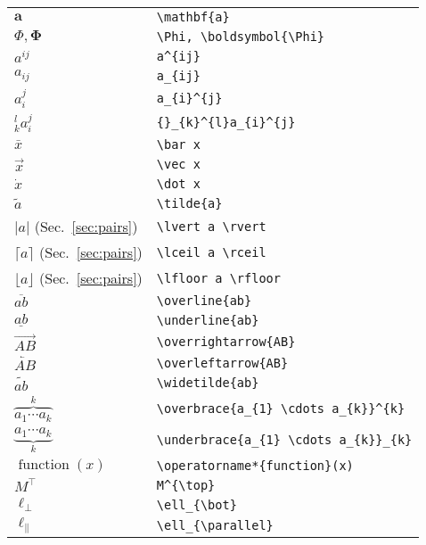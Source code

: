 \documentclass[a4paper,10pt,landscape]{article}
\theoremstyle{definition}
\theoremstyle{remark}
\newcommand{\refsec}[1]{Sec.~\ref{#1}}
\begin{document}
\begin{multicols}{3}
\begin{tabular}{@{}ll@{}}
	$\mathbf{a}$	&\verb!\mathbf{a}!\\
	$\Phi, \boldsymbol{\Phi}$	&\verb!\Phi, \boldsymbol{\Phi}!\\
	$a^{ij}$	&\verb!a^{ij}!\\
	$a_{ij}$	&\verb!a_{ij}!\\
	$a_{i}^{j}$	&\verb!a_{i}^{j}!\\
	${}_{k}^{l}a_{i}^{j}$	&\verb!{}_{k}^{l}a_{i}^{j}!\\
	$\bar x$	&\verb!\bar x!\\
	$\vec x$	&\verb!\vec x!\\
	$\dot x$	&\verb!\dot x!\\
	$\tilde{a}$	&\verb!\tilde{a}!\\
	$\lvert a \rvert$ (\refsec{sec:pairs})	&\verb!\lvert a \rvert!\\
	$\lceil a \rceil$ (\refsec{sec:pairs})	&\verb!\lceil a \rceil!\\
	$\lfloor a \rfloor$ (\refsec{sec:pairs})	&\verb!\lfloor a \rfloor!\\
	$\overline{ab}$	&\verb!\overline{ab}!\\
	$\underline{ab}$	&\verb!\underline{ab}!\\
	$\overrightarrow{AB}$	&\verb!\overrightarrow{AB}!\\
	$\overleftarrow{AB}$	&\verb!\overleftarrow{AB}!\\
	$\widetilde{ab}$	&\verb!\widetilde{ab}!\\
	$\overbrace{a_{1} \cdots a_{k}}^{k}$	&\verb!\overbrace{a_{1} \cdots a_{k}}^{k}!\\
	$\underbrace{a_{1} \cdots a_{k}}_{k}$	&\verb!\underbrace{a_{1} \cdots a_{k}}_{k}!\\
	$\operatorname*{function}(x)$	&\verb!\operatorname*{function}(x)!\\
	$M^{\top}$	&\verb!M^{\top}!\\
	$\ell_{\bot}$	&\verb!\ell_{\bot}!\\
	$\ell_{\parallel}$	&\verb!\ell_{\parallel}!\\
\end{tabular}





\end{multicols}
\end{document}
